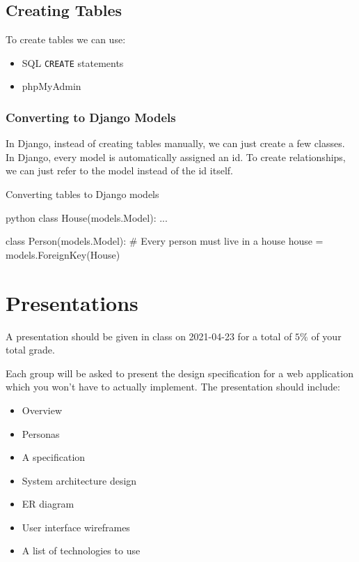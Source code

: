 \subsection{Creating Tables}\label{sub:creating_tables}

To create tables we can use:
\begin{itemize}
	\item SQL \texttt{CREATE} statements
	\item phpMyAdmin
\end{itemize}

\subsubsection{Converting to Django Models}\label{ssub:converting_to_django_models}

In Django, instead of creating tables manually, we can just create a few classes.
In Django, every model is automatically assigned an id.
To create relationships, we can just refer to the model instead of the id itself.

\begin{highlight}{Converting tables to Django models}
	\begin{code}{python}
		class House(models.Model):
		...

		class Person(models.Model):
            # Every person must live in a house
            house = models.ForeignKey(House)
	\end{code}
\end{highlight}

\section{Presentations}\label{sec:presentations}

A presentation should be given in class on 2021-04-23 for a total of \(5\%\) of your total grade.

Each group will be asked to present the design specification for a web application which you won't have to actually implement.
The presentation should include:
\begin{itemize}
	\item Overview
	\item Personas
	\item A specification
	\item System architecture design
	\item ER diagram
	\item User interface wireframes
	\item A list of technologies to use
\end{itemize}
